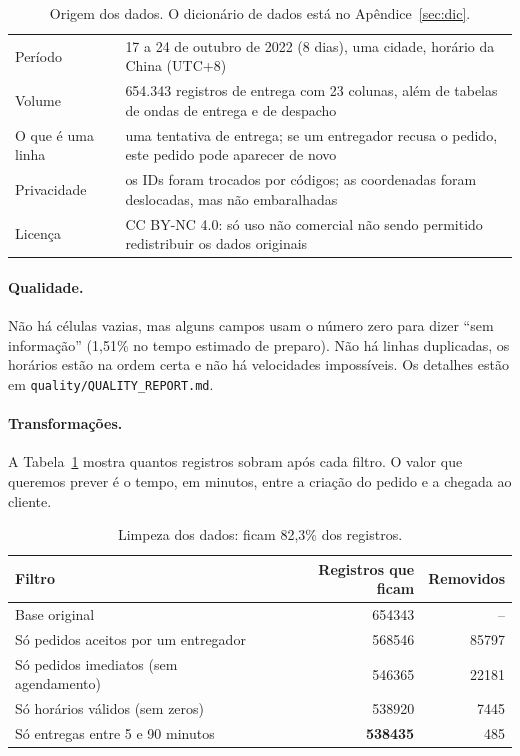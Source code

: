 \documentclass[11pt,a4paper]{article}
\begin{document}
\begin{table}[H]
\centering\small
\begin{tabularx}{\linewidth}{l L}
\toprule
Período & 17 a 24 de outubro de 2022 (8 dias), uma cidade, horário da China (UTC+8) \\
Volume & 654.343 registros de entrega com 23 colunas, além de tabelas de ondas de entrega e de despacho \\
O que é uma linha & uma tentativa de entrega; se um entregador recusa o pedido, este pedido pode aparecer de novo \\
Privacidade & os IDs foram trocados por códigos; as coordenadas foram deslocadas, mas não embaralhadas \\
Licença & CC BY-NC 4.0: só uso não comercial não sendo permitido redistribuir os dados originais \\
\bottomrule
\end{tabularx}
\caption{Origem dos dados. O dicionário de dados está no Apêndice~\ref{sec:dic}.}
\end{table}

\paragraph{Qualidade.} Não há células vazias, mas alguns campos usam o número zero para dizer
``sem informação'' (1,51\% no tempo estimado de preparo). Não há linhas duplicadas, os
horários estão na ordem certa e não há velocidades impossíveis. Os detalhes estão em
\texttt{quality/QUALITY\_REPORT.md}.

\paragraph{Transformações.} A Tabela~\ref{tab:funil} mostra quantos registros sobram após cada
filtro. O valor que queremos prever é o tempo, em minutos, entre a criação do pedido e a
chegada ao cliente.

\begin{table}[H]
\centering\small
\begin{tabular}{l r r}
\toprule
Filtro & Registros que ficam & Removidos \\
\midrule
Base original & \num{654343} & -- \\
Só pedidos aceitos por um entregador & \num{568546} & \num{85797} \\
Só pedidos imediatos (sem agendamento) & \num{546365} & \num{22181} \\
Só horários válidos (sem zeros) & \num{538920} & \num{7445} \\
Só entregas entre 5 e 90 minutos & \textbf{\num{538435}} & 485 \\
\bottomrule
\end{tabular}
\caption{Limpeza dos dados: ficam 82,3\% dos registros.}
\label{tab:funil}
\end{table}
\end{document}
